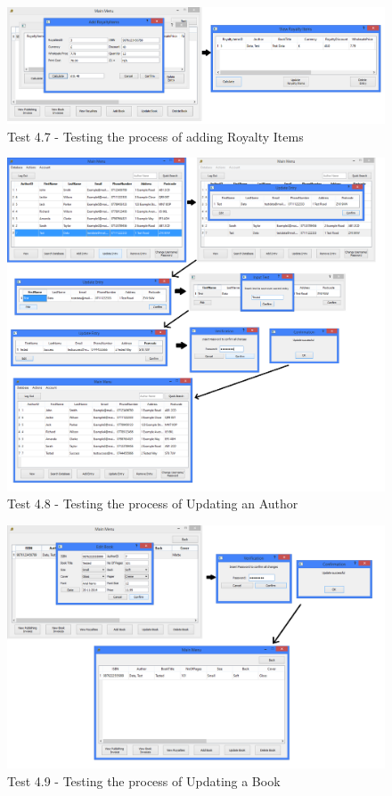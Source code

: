 \begin{landscape}
\begin{figure}[H]
    \includegraphics[width=\textwidth]{./Testing/Evidence/Series4/AddRoyaltyItemsTest.png}
    \caption{Test 4.7 - Testing the process of adding Royalty Items}  \label{fig:AddRoyaltyItemsTest}
\end{figure}

\begin{figure}[H]
    \includegraphics[width=\textwidth]{./Testing/Evidence/Series4/UpdateAuthorTest.png}
    \caption{Test 4.8 - Testing the process of Updating an Author}  \label{fig:UpdateAuthorTest}
\end{figure}

\begin{figure}[H]
    \includegraphics[width=\textwidth]{./Testing/Evidence/Series4/UpdateBookTest.png}
    \caption{Test 4.9 - Testing the process of Updating a Book}  \label{fig:UpdateBookTest}
\end{figure}


\end{landscape}
